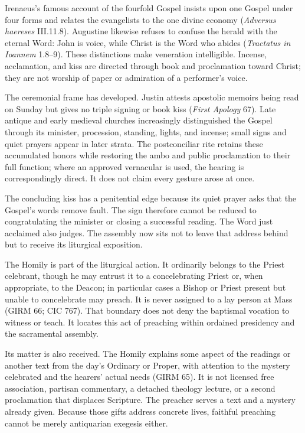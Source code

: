 Irenaeus's famous account of the fourfold Gospel insists upon one Gospel under four forms and relates the evangelists to the one divine economy (\emph{Adversus haereses} III.11.8). Augustine likewise refuses to confuse the herald with the eternal Word: John is voice, while Christ is the Word who abides (\emph{Tractatus in Ioannem} 1.8--9). These distinctions make veneration intelligible. Incense, acclamation, and kiss are directed through book and proclamation toward Christ; they are not worship of paper or admiration of a performer's voice.

The ceremonial frame has developed. Justin attests apostolic memoirs being read on Sunday but gives no triple signing or book kiss (\emph{First Apology} 67). Late antique and early medieval churches increasingly distinguished the Gospel through its minister, procession, standing, lights, and incense; small signs and quiet prayers appear in later strata. The postconciliar rite retains these accumulated honors while restoring the ambo and public proclamation to their full function; where an approved vernacular is used, the hearing is correspondingly direct. It does not claim every gesture arose at once.

The concluding kiss has a penitential edge because its quiet prayer asks that the Gospel's words remove fault. The sign therefore cannot be reduced to congratulating the minister or closing a successful reading. The Word just acclaimed also judges. The assembly now sits not to leave that address behind but to receive its liturgical exposition.


The Homily is part of the liturgical action. It ordinarily belongs to the Priest celebrant, though he may entrust it to a concelebrating Priest or, when appropriate, to the Deacon; in particular cases a Bishop or Priest present but unable to concelebrate may preach. It is never assigned to a lay person at Mass (GIRM 66; CIC 767). That boundary does not deny the baptismal vocation to witness or teach. It locates this act of preaching within ordained presidency and the sacramental assembly.

Its matter is also received. The Homily explains some aspect of the readings or another text from the day's Ordinary or Proper, with attention to the mystery celebrated and the hearers' actual needs (GIRM 65). It is not licensed free association, partisan commentary, a detached theology lecture, or a second proclamation that displaces Scripture. The preacher serves a text and a mystery already given. Because those gifts address concrete lives, faithful preaching cannot be merely antiquarian exegesis either.

